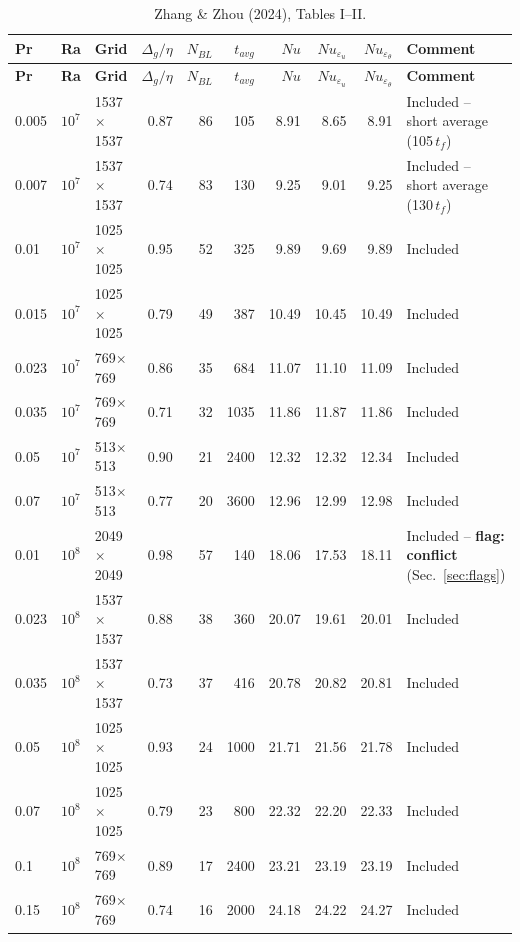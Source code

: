 \documentclass[11pt]{article}
\begin{document}
\begin{longtable}{l l l r r r r r r p{3.3cm}}
\caption{Zhang \& Zhou (2024), Tables I--II.}\label{tab:zz2024}\\
\toprule
\textbf{Pr} & \textbf{Ra} & \textbf{Grid} & $\Delta_g/\eta$ & $N_{BL}$ & $t_{avg}$ & $Nu$ & $Nu_{\varepsilon_u}$ & $Nu_{\varepsilon_\theta}$ & \textbf{Comment} \\
\midrule
\endfirsthead
\toprule
\textbf{Pr} & \textbf{Ra} & \textbf{Grid} & $\Delta_g/\eta$ & $N_{BL}$ & $t_{avg}$ & $Nu$ & $Nu_{\varepsilon_u}$ & $Nu_{\varepsilon_\theta}$ & \textbf{Comment} \\
\midrule
\endhead
\bottomrule
\endfoot
\rowcolor{included} 0.005 & $10^{7}$ & 1537$\times$1537 & 0.87 & 86 & 105 & 8.91 & 8.65 & 8.91 & Included -- short average (105\,$t_f$) \\
\rowcolor{included} 0.007 & $10^{7}$ & 1537$\times$1537 & 0.74 & 83 & 130 & 9.25 & 9.01 & 9.25 & Included -- short average (130\,$t_f$) \\
\rowcolor{included} 0.01 & $10^{7}$ & 1025$\times$1025 & 0.95 & 52 & 325 & 9.89 & 9.69 & 9.89 & Included \\
\rowcolor{included} 0.015 & $10^{7}$ & 1025$\times$1025 & 0.79 & 49 & 387 & 10.49 & 10.45 & 10.49 & Included \\
\rowcolor{included} 0.023 & $10^{7}$ & 769$\times$769 & 0.86 & 35 & 684 & 11.07 & 11.10 & 11.09 & Included \\
\rowcolor{included} 0.035 & $10^{7}$ & 769$\times$769 & 0.71 & 32 & 1035 & 11.86 & 11.87 & 11.86 & Included \\
\rowcolor{included} 0.05 & $10^{7}$ & 513$\times$513 & 0.90 & 21 & 2400 & 12.32 & 12.32 & 12.34 & Included \\
\rowcolor{included} 0.07 & $10^{7}$ & 513$\times$513 & 0.77 & 20 & 3600 & 12.96 & 12.99 & 12.98 & Included \\
\rowcolor{included} 0.01 & $10^{8}$ & 2049$\times$2049 & 0.98 & 57 & 140 & 18.06 & 17.53 & 18.11 & Included -- \textbf{flag: conflict} (Sec.~\ref{sec:flags}) \\
\rowcolor{included} 0.023 & $10^{8}$ & 1537$\times$1537 & 0.88 & 38 & 360 & 20.07 & 19.61 & 20.01 & Included \\
\rowcolor{included} 0.035 & $10^{8}$ & 1537$\times$1537 & 0.73 & 37 & 416 & 20.78 & 20.82 & 20.81 & Included \\
\rowcolor{included} 0.05 & $10^{8}$ & 1025$\times$1025 & 0.93 & 24 & 1000 & 21.71 & 21.56 & 21.78 & Included \\
\rowcolor{included} 0.07 & $10^{8}$ & 1025$\times$1025 & 0.79 & 23 & 800 & 22.32 & 22.20 & 22.33 & Included \\
\rowcolor{included} 0.1 & $10^{8}$ & 769$\times$769 & 0.89 & 17 & 2400 & 23.21 & 23.19 & 23.19 & Included \\
\rowcolor{included} 0.15 & $10^{8}$ & 769$\times$769 & 0.74 & 16 & 2000 & 24.18 & 24.22 & 24.27 & Included \\
\end{longtable}
\end{document}
